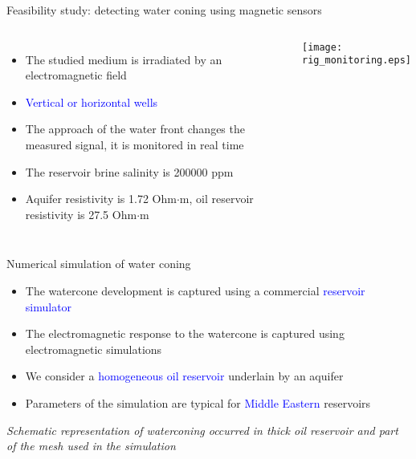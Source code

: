 \documentclass[aspectratio=169]{beamer}
\begin{document}
\begin{frame}{Feasibility study: detecting water coning using magnetic sensors}

\begin{columns}[c] 


    
\begin{itemize}
\item The studied medium is irradiated by an electromagnetic field 
\item \textcolor{blue} {Vertical or horizontal wells}
\item The approach of the water front changes the measured signal, it is monitored in real time
\item The reservoir brine salinity is 200000 ppm
\item Aquifer resistivity is 1.72 Ohm$\cdot$m, oil reservoir resistivity is 27.5 Ohm$\cdot$m
\end{itemize}



\texttt{[image: rig\_monitoring.eps]}

\end{columns}

\end{frame}

\begin{frame}{Numerical simulation of water coning}
\begin{itemize}

\item The watercone development is captured using a commercial \textcolor{blue} {reservoir simulator}
\item The electromagnetic response to the watercone is captured using electromagnetic simulations
\item We consider a \textcolor{blue} {homogeneous oil reservoir} underlain by an aquifer
\item Parameters of the simulation are typical for \textcolor{blue} {Middle Eastern} reservoirs
\end{itemize}

	\begin{minipage}{0.34\linewidth}
		\textit{Schematic representation of waterconing occurred in thick oil reservoir and part of the mesh used in the simulation}
	\end{minipage}
	\begin{minipage}{0.32\linewidth}
	\end{minipage}
	\hfill
	\begin{minipage}{0.32\linewidth}
	\end{minipage}



\end{frame}
\end{document}
